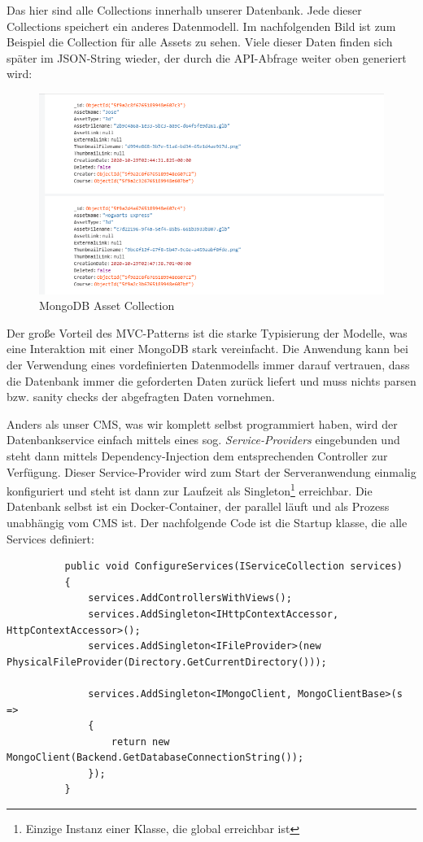 \documentclass[titlepage, a4paper, 11pt]{scrartcl}
\begin{document}
        Das hier sind alle Collections innerhalb unserer Datenbank. Jede dieser Collections speichert ein anderes Datenmodell. Im nachfolgenden Bild ist zum Beispiel die Collection für alle Assets zu sehen.
        Viele dieser Daten finden sich später im JSON-String wieder, der durch die API-Abfrage weiter oben generiert wird:

        \begin{figure}[h]
          \centering
          \includegraphics[width=.8\textwidth]{MongoAssets.PNG}
          \caption{MongoDB Asset Collection}
          \label{MongoAssets}
        \end{figure}

        Der große Vorteil des MVC-Patterns ist die starke Typisierung der Modelle, was eine Interaktion mit einer MongoDB stark vereinfacht.
        Die Anwendung kann bei der Verwendung eines vordefinierten Datenmodells immer darauf vertrauen, dass die Datenbank immer die geforderten Daten zurück liefert 
        und muss nichts parsen bzw. sanity checks der abgefragten Daten vornehmen.
        
        Anders als unser CMS, was wir komplett selbst programmiert haben, wird der Datenbankservice einfach mittels eines sog. \textit{Service-Providers} eingebunden
        und steht dann mittels Dependency-Injection dem entsprechenden Controller zur Verfügung. Dieser Service-Provider wird zum Start der Serveranwendung einmalig 
        konfiguriert und steht ist dann zur Laufzeit als Singleton\footnote{Einzige Instanz einer Klasse, die global erreichbar ist} erreichbar. Die Datenbank selbst ist ein Docker-Container,
        der parallel läuft und als Prozess unabhängig vom CMS ist. Der nachfolgende Code ist die Startup klasse, die alle Services definiert:

        \begin{lstlisting}          
          public void ConfigureServices(IServiceCollection services)
          {
              services.AddControllersWithViews();
              services.AddSingleton<IHttpContextAccessor, HttpContextAccessor>();
              services.AddSingleton<IFileProvider>(new PhysicalFileProvider(Directory.GetCurrentDirectory()));
  
              services.AddSingleton<IMongoClient, MongoClientBase>(s =>
              {
                  return new MongoClient(Backend.GetDatabaseConnectionString());
              });
          }
        \end{lstlisting}
\end{document}
